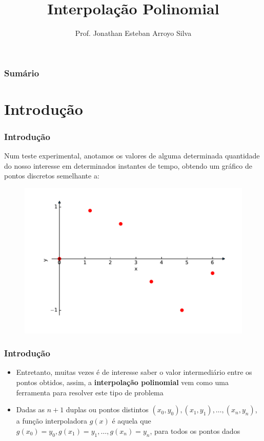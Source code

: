 \documentclass{beamer}
\title{Interpolação Polinomial}
\author
{
	Prof. Jonathan Esteban Arroyo Silva	
}
\institute
{
	Departamento de Ciência da Computação\\
	Universidade Federal de São João del-Rei\\
	\texttt{silva.jea@ufsj.edu.br}
}
\date{}
\theoremstyle{mystyle}
\begin{document}
	
\begin{frame}[plain]
    \maketitle
\end{frame}

\begin{frame}[plain]
	\frametitle{Sumário}
	\tableofcontents
\end{frame}

\section{Introdução}
\begin{frame}
	\frametitle{Introdução}
	Num teste experimental, anotamos os valores de alguma determinada quantidade do nosso interesse em determinados instantes de tempo, obtendo um gráfico de pontos discretos semelhante a:
\begin{figure}
	\centering
	\includegraphics[width=0.8\linewidth]{Figuras/grafico_01}
	\label{fig:grafico01}
\end{figure}
\end{frame}

\begin{frame}
	\frametitle{Introdução}
	\begin{itemize}
		\item Entretanto, muitas vezes é de interesse saber o valor intermediário entre os pontos obtidos, assim, a \textbf{interpolação polinomial} vem como uma ferramenta para resolver este tipo de problema
		\item Dadas as $ n + 1 $ duplas ou pontos distintos $ (x_{0}, y_{0}), (x_{1}, y_{1}),\ldots, (x_{n}, y_{n}) $, a função interpoladora $ g(x) $ é aquela que $ g(x_{0}) = y_{0}, g(x_{1}) = y_{1},\ldots, g(x_{n}) = y_{n} $, para todos os pontos dados
	\end{itemize}
\end{frame}
\end{document}
